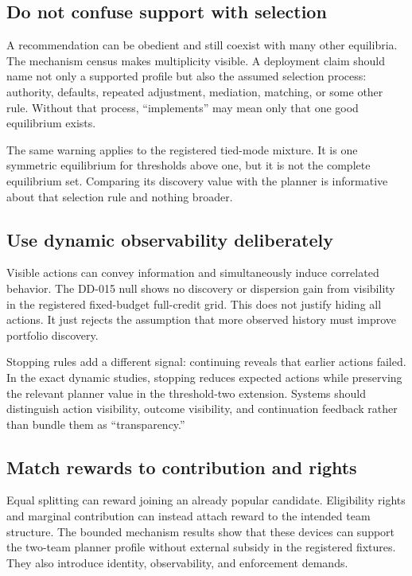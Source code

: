 \documentclass[11pt]{article}
\begin{document}
\subsection{Do not confuse support with selection}

A recommendation can be obedient and still coexist with many other
equilibria. The mechanism census makes multiplicity visible. A deployment
claim should name not only a supported profile but also the assumed selection
process: authority, defaults, repeated adjustment, mediation, matching, or
some other rule. Without that process, ``implements'' may mean only that one
good equilibrium exists.

The same warning applies to the registered tied-mode mixture. It is one
symmetric equilibrium for thresholds above one, but it is not the complete
equilibrium set. Comparing its discovery value with the planner is informative
about that selection rule and nothing broader.

\subsection{Use dynamic observability deliberately}

Visible actions can convey information and simultaneously induce correlated
behavior. The DD-015 null shows no discovery or dispersion gain from visibility
in the registered fixed-budget full-credit grid. This does not justify hiding
all actions. It just rejects the assumption that more observed history must
improve portfolio discovery.

Stopping rules add a different signal: continuing reveals that earlier actions
failed. In the exact dynamic studies, stopping reduces expected actions while
preserving the relevant planner value in the threshold-two extension. Systems
should distinguish action visibility, outcome visibility, and continuation
feedback rather than bundle them as ``transparency.''

\subsection{Match rewards to contribution and rights}

Equal splitting can reward joining an already popular candidate. Eligibility
rights and marginal contribution can instead attach reward to the intended
team structure. The bounded mechanism results show that these devices can
support the two-team planner profile without external subsidy in the registered
fixtures. They also introduce identity, observability, and enforcement demands.
\end{document}
